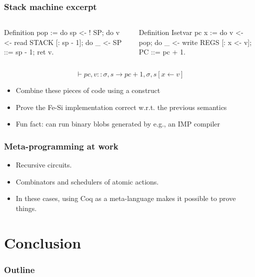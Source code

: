 \documentclass[9pt]{beamer}
\begin{document}
\begin{frame}[fragile]
  \frametitle{Stack machine excerpt}
  \begin{columns}
\begin{coq}
Definition pop :=
do sp <- ! SP;       
do v <- read STACK [: sp - 1];
do _ <- SP ::= sp - 1;
ret v.    
\end{coq}
\begin{coq}
Definition Isetvar pc x := 
do v <- pop; 
do _ <- write REGS [: x <- v];
PC ::= pc + 1.
$ $
\end{coq}
  \end{columns}
  \begin{displaymath}
\vdash pc,v::\sigma,s \to pc+1, \sigma,s[x \leftarrow v]
  \end{displaymath}
  \begin{itemize}
  \item Combine these pieces of code using a  construct
  \item Prove the Fe-Si implementation correct w.r.t. the previous
    semantics
  \item Fun fact: can run binary blobs generated by e.g., an IMP
    compiler
  \end{itemize}
\end{frame}
\begin{frame}[fragile]
  \frametitle{Meta-programming at work}

  \begin{itemize}
  \item Recursive circuits. 
  \item \alert{Combinators and schedulers} of atomic actions.
  \item In these cases, using Coq as a meta-language makes it possible
    to prove things. 
  \end{itemize}
\end{frame}


\section{Conclusion}
\begin{frame}
  \frametitle{Outline}       
  \tableofcontents [currentsection] 
\end{frame}
\end{document}

